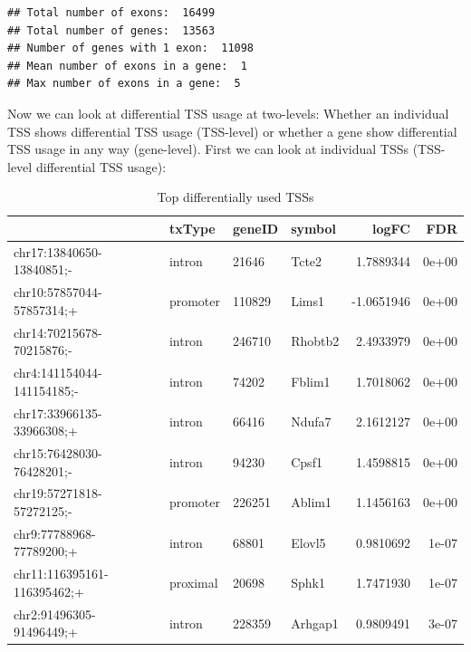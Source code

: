 \documentclass[9pt,a4paper,]{extarticle}
\newenvironment{Shaded}{\begin{snugshade}}{\end{snugshade}}
\newcommand{\KeywordTok}[1]{\textcolor[rgb]{0.13,0.29,0.53}{\textbf{{#1}}}}
\newcommand{\DataTypeTok}[1]{\textcolor[rgb]{0.13,0.29,0.53}{{#1}}}
\newcommand{\StringTok}[1]{\textcolor[rgb]{0.31,0.60,0.02}{{#1}}}
\newcommand{\NormalTok}[1]{{#1}}
\begin{document}
\begin{verbatim}
## Total number of exons:  16499 
## Total number of genes:  13563 
## Number of genes with 1 exon:  11098 
## Mean number of exons in a gene:  1 
## Max number of exons in a gene:  5
\end{verbatim}

Now we can look at differential TSS usage at two-levels: Whether an individual TSS shows differential TSS usage (TSS-level) or whether a gene show differential TSS usage in any way (gene-level). First we can look at individual TSSs (TSS-level differential TSS usage):

\begin{Shaded}
\end{Shaded}

\begin{table}[t]

\caption{\label{tab:dtuTSS}Top differentially used TSSs}
\centering
\begin{tabular}{l|l|l|l|r|r}
\hline
  & txType & geneID & symbol & logFC & FDR\\
\hline
chr17:13840650-13840851;- & intron & 21646 & Tcte2 & 1.7889344 & 0e+00\\
\hline
chr10:57857044-57857314;+ & promoter & 110829 & Lims1 & -1.0651946 & 0e+00\\
\hline
chr14:70215678-70215876;- & intron & 246710 & Rhobtb2 & 2.4933979 & 0e+00\\
\hline
chr4:141154044-141154185;- & intron & 74202 & Fblim1 & 1.7018062 & 0e+00\\
\hline
chr17:33966135-33966308;+ & intron & 66416 & Ndufa7 & 2.1612127 & 0e+00\\
\hline
chr15:76428030-76428201;- & intron & 94230 & Cpsf1 & 1.4598815 & 0e+00\\
\hline
chr19:57271818-57272125;- & promoter & 226251 & Ablim1 & 1.1456163 & 0e+00\\
\hline
chr9:77788968-77789200;+ & intron & 68801 & Elovl5 & 0.9810692 & 1e-07\\
\hline
chr11:116395161-116395462;+ & proximal & 20698 & Sphk1 & 1.7471930 & 1e-07\\
\hline
chr2:91496305-91496449;+ & intron & 228359 & Arhgap1 & 0.9809491 & 3e-07\\
\hline
\end{tabular}
\end{table}
\end{document}
